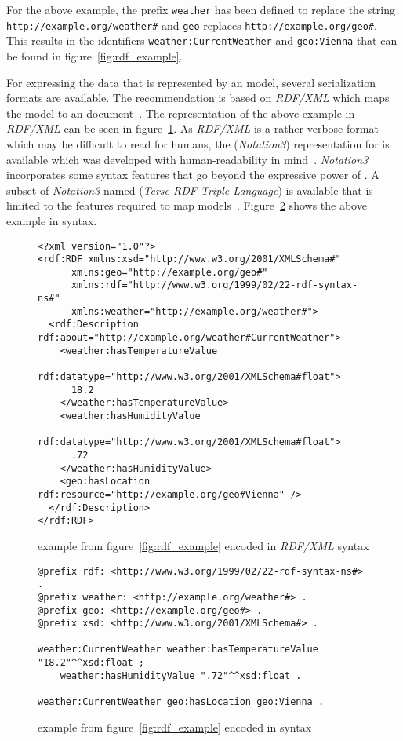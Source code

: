 For the above example, the prefix \texttt{weather} has been defined to replace the string \texttt{http://\hspace{0pt}example.org/weather\#} and \texttt{geo} replaces \texttt{http://example.org/geo\#}. This results in the identifiers \texttt{weather:CurrentWeather} and \texttt{geo:Vienna} that can be found in figure~\ref{fig:rdf_example}.

For expressing the data that is represented by an  model, several serialization formats are available. The  recommendation is based on \emph{RDF/XML} which maps the  model to an  document~\cite{RDF_XML}. The representation of the above example in \emph{RDF/XML} can be seen in figure~\ref{fig:rdfxml_example}. As \emph{RDF/XML} is a rather verbose format which may be difficult to read for humans, the  (\emph{Notation3}) representation for  is available which was developed with human-readability in mind~\cite{Notation3}. \emph{Notation3} incorporates some syntax features that go beyond the expressive power of . A subset of \emph{Notation3} named  (\emph{Terse RDF Triple Language}) is available that is limited to the features required to map  models~\cite{Turtle}. Figure~\ref{fig:turtle_example} shows the above example in  syntax.

\begin{figure} %
\begin{lstlisting}
<?xml version="1.0"?>
<rdf:RDF xmlns:xsd="http://www.w3.org/2001/XMLSchema#"
      xmlns:geo="http://example.org/geo#"
      xmlns:rdf="http://www.w3.org/1999/02/22-rdf-syntax-ns#"
      xmlns:weather="http://example.org/weather#">
  <rdf:Description rdf:about="http://example.org/weather#CurrentWeather">
    <weather:hasTemperatureValue
	  rdf:datatype="http://www.w3.org/2001/XMLSchema#float">
      18.2
    </weather:hasTemperatureValue>
    <weather:hasHumidityValue
	  rdf:datatype="http://www.w3.org/2001/XMLSchema#float">
      .72
    </weather:hasHumidityValue>
    <geo:hasLocation rdf:resource="http://example.org/geo#Vienna" />
  </rdf:Description>
</rdf:RDF>
\end{lstlisting}
\caption{ example from figure~\ref{fig:rdf_example} encoded in \emph{RDF/XML} syntax}
\label{fig:rdfxml_example}
\end{figure}

\begin{figure}
\begin{lstlisting}
@prefix rdf: <http://www.w3.org/1999/02/22-rdf-syntax-ns#> .
@prefix weather: <http://example.org/weather#> .
@prefix geo: <http://example.org/geo#> .
@prefix xsd: <http://www.w3.org/2001/XMLSchema#> .

weather:CurrentWeather weather:hasTemperatureValue "18.2"^^xsd:float ;
    weather:hasHumidityValue ".72"^^xsd:float .

weather:CurrentWeather geo:hasLocation geo:Vienna .
\end{lstlisting}
\caption{ example from figure~\ref{fig:rdf_example} encoded in  syntax}
\label{fig:turtle_example}
\end{figure}

